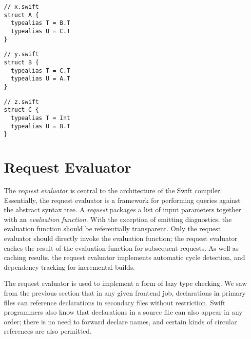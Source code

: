 \documentclass[a4paper,headsepline,bibliography=totoc,toc=flat,fleqn,twoside=semi]{scrbook}
\theoremstyle{definition}
\theoremstyle{definition}
\theoremstyle{definition}
\begin{document}
\begin{listing}\label{defeatdelayparse}
\begin{Verbatim}
// x.swift
struct A {
  typealias T = B.T
  typealias U = C.T
}
\end{Verbatim}
\begin{Verbatim}
// y.swift
struct B {
  typealias T = C.T
  typealias U = A.T
}
\end{Verbatim}
\begin{Verbatim}
// z.swift
struct C {
  typealias T = Int
  typealias U = B.T
}
\end{Verbatim}
\end{listing}

\section{Request Evaluator}\label{request evaluator}

The \emph{request evaluator} is central to the architecture of the Swift compiler. Essentially, the request evaluator is a framework for performing queries against the abstract syntax tree. A \emph{request} packages a list of input parameters together with an \emph{evaluation function}. With the exception of emitting diagnostics, the evaluation function should be referentially transparent. Only the request evaluator should directly invoke the evaluation function; the request evaluator caches the result of the evaluation function for subsequent requests. As well as caching results, the request evaluator implements automatic cycle detection, and dependency tracking for incremental builds.

The request evaluator is used to implement a form of lazy type checking. We saw from the previous section that in any given frontend job, declarations in primary files can reference declarations in secondary files without restriction. Swift programmers also know that declarations in a source file can also appear in any order; there is no need to forward declare names, and certain kinds of circular references are also permitted.
\end{document}
